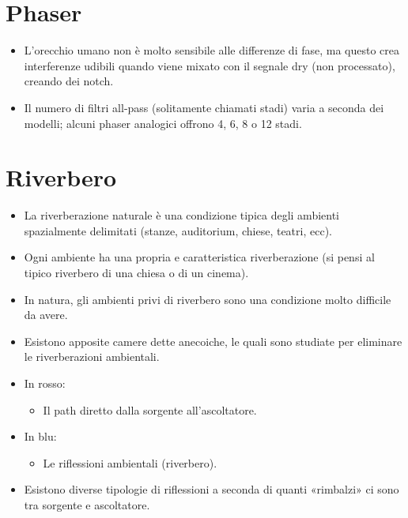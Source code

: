 \section{Phaser}
\begin{itemize}
    \item L'orecchio umano non è molto sensibile alle differenze di fase, ma questo crea interferenze udibili quando viene mixato con il segnale dry (non processato), creando dei notch.
    \item Il numero di filtri all-pass (solitamente chiamati stadi) varia a seconda dei modelli; alcuni phaser analogici offrono 4, 6, 8 o 12 stadi.
\end{itemize}

\section*{Riverbero}

\begin{itemize}
    \item La riverberazione naturale è una condizione tipica degli ambienti spazialmente delimitati (stanze, auditorium, chiese, teatri, ecc).
    
    \item Ogni ambiente ha una propria e caratteristica riverberazione (si pensi al tipico riverbero di una chiesa o di un cinema).
    
    \item In natura, gli ambienti privi di riverbero sono una condizione molto difficile da avere.
    
    \item Esistono apposite camere dette anecoiche, le quali sono studiate per eliminare le riverberazioni ambientali.
\end{itemize}

\begin{itemize}
    \item In rosso: 
    \begin{itemize}
        \item Il path diretto dalla sorgente all’ascoltatore.
    \end{itemize}
    
    \item In blu:
    \begin{itemize}
        \item Le riflessioni ambientali (riverbero).
    \end{itemize}
    
    \item Esistono diverse tipologie di riflessioni a seconda di quanti «rimbalzi» ci sono tra sorgente e ascoltatore.
\end{itemize}

